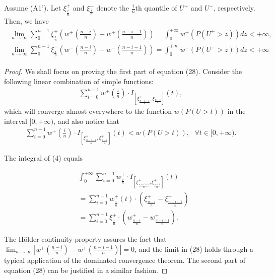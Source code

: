 \begin{proposition}
\label{prop:holder-quantile}
Assume (A1'). Let $\xi^+_{\frac{i}{n}}$ and $\xi^-_{\frac{i}{n}}$ denote the $\frac{i}{n}$th quantile of $U^+$ and $U^-$, respectively. Then, we have 
\begin{align}
\label{eq:simple-estimation}
\begin{split}
\lim_{n \rightarrow \infty} \sum_0^{n-1} \xi^+_{\frac{i}{n}} (w^+(\frac{n-i}{n})- w^+(\frac{n-i-1}{n}) ) = \int_0^{+\infty} w^+(P(U^+>z)) dz < +\infty,
\\
\lim_{n \rightarrow \infty} \sum_0^{n-1} \xi^-_{\frac{i}{n}} (w^-(\frac{n-i}{n})- w^-(\frac{n-i-1}{n}) ) = \int_0^{+\infty} w^-(P(U^->z)) dz < +\infty
\end{split}
\end{align}
\end{proposition}


\begin{proof}
We shall focus on proving the first part of equation (28). Consider the following linear combination of simple functions: 
\begin{align}
\sum_{i=0}^{n-1} w^+ (\frac{i}{n}) 
\cdot I_{[\xi^+_\frac{n-i-1}{n}, \xi_\frac{n-i}{n}]}(t),
\end{align}
which will converge almost everywhere to the function $w(P(U>t))$ in the interval $[0, +\infty)$, and also notice that 
\begin{align}
\sum_{i=0}^{n-1} w^+ (\frac{i}{n}) 
\cdot I_{[\xi^+_\frac{n-i-1}{n}, \xi^+_\frac{n-i}{n}]}(t)
<
w(P(U>t)),
\text{         } \forall t \in [0,+\infty).
\end{align}

The integral of (4) equals  

\begin{align}
& \int_0^{+\infty} \sum_{i=0}^{n-1} w^+_{\frac{i}{n}} \cdot I_{[\xi^+_\frac{n-i-1}{n},
\xi^+_\frac{n-i}{n}]}(t) \\ & = \sum_{i=0}^{n-1} w^+_{\frac{i}{n}}(t) \cdot (\xi^+_{\frac{n-i}{n}} -
\xi^+_{\frac{n-i-1}{n}}) \\ & = \sum_{i=0}^{n-1} \xi^+_{\frac{i}{n}} \cdot (w^+_{\frac{n-i}{n}}-
    w^+_{\frac{n-i-1}{n}}).
\end{align}

The H\"{o}lder continuity property assures the fact that 
$\lim_{n \rightarrow \infty}  | w^+(\frac{n-i}{n})- w^+(\frac{n-i-1}{n})| =0$, and the limit in (28) holds through a typical application of the dominated convergence theorem.
The second part of equation (28) can be justified in a similar fashion.
\end{proof} 

